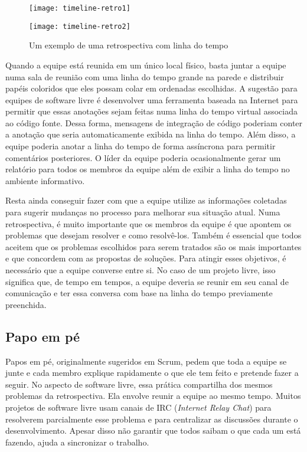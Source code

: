 \begin{figure}[htb]
  \begin{minipage}[t]{0.5\linewidth}
    \centering
    \texttt{[image: timeline-retro1]}
  \end{minipage}
  \begin{minipage}[t]{0.5\linewidth}
    \centering
    \texttt{[image: timeline-retro2]}
  \end{minipage}
  \caption{Um exemplo de uma retrospectiva com linha do tempo}
  \label{fig:timelineretro}
\end{figure}

Quando a equipe está reunida em um único local físico, basta juntar a
equipe numa sala de reunião com uma linha do tempo grande na parede e
distribuir papéis coloridos que eles possam colar em ordenadas
escolhidas. A sugestão para equipes de software livre é desenvolver
uma ferramenta baseada na Internet para permitir que essas anotações
sejam feitas numa linha do tempo virtual associada ao código
fonte. Dessa forma, mensagens de integração de código poderiam conter
a anotação que seria automaticamente exibida na linha do tempo. Além
disso, a equipe poderia anotar a linha do tempo de forma assíncrona
para permitir comentários posteriores. O líder da equipe poderia
ocasionalmente gerar um relatório para todos os membros da equipe além
de exibir a linha do tempo no ambiente informativo.

Resta ainda conseguir fazer com que a equipe utilize as informações
coletadas para sugerir mudanças no processo para melhorar sua situação
atual. Numa retrospectiva, é muito importante que os membros da equipe
é que apontem os problemas que desejam resolver e como
resolvê-los. Também é essencial que todos aceitem que os problemas
escolhidos para serem tratados são os mais importantes e que concordem
com as propostas de soluções. Para atingir esses objetivos, é
necessário que a equipe converse entre si. No caso de um projeto
livre, isso significa que, de tempo em tempos, a equipe deveria se
reunir em seu canal de comunicação e ter essa conversa com base na
linha do tempo previamente preenchida.

\subsection{Papo em pé}
\label{subsec:stand-up}

Papos em pé, originalmente sugeridos em Scrum, pedem que toda a equipe
se junte e cada membro explique rapidamente o que ele tem feito e
pretende fazer a seguir. No aspecto de software livre, essa prática
compartilha dos mesmos problemas da retrospectiva. Ela envolve reunir
a equipe ao mesmo tempo. Muitos projetos de software livre usam canais
de IRC (\emph{Internet Relay Chat}) para resolverem parcialmente esse
problema e para centralizar as discussões durante o
desenvolvimento. Apesar disso não garantir que todos saibam o que cada
um está fazendo, ajuda a sincronizar o trabalho.

